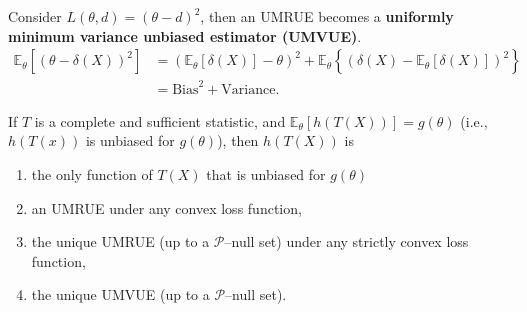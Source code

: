 Consider $L(\theta, d) = (\theta-d)^2$, then an UMRUE becomes a \textbf{uniformly minimum variance unbiased estimator (UMVUE)}.
\begin{align*}
\mathbb{E}_\theta\left[(\theta - \delta(X))^2\right] &= \left(\mathbb{E}_\theta[\delta(X)] - \theta\right)^2 + \mathbb{E}_\theta\left\{\left(\delta(X) - \mathbb{E}_\theta[\delta(X)]\right)^2\right\} \\
&= \text{Bias}^2 + \text{Variance}.
\end{align*}
\begin{thm}
If $T$ is a complete and sufficient statistic, and $\mathbb{E}_\theta[h(T(X))] = g(\theta)$ (i.e., $h(T(x))$ is unbiased for $g(\theta)$), then $h(T(X))$ is
\begin{enumerate}
    \item the only function of $T(X)$ that is unbiased for $g(\theta)$
    \item an UMRUE under any convex loss function,
    \item the unique UMRUE (up to a $\mathcal{P}$--null set) under any strictly convex loss function,
    \item the unique UMVUE (up to a $\mathcal{P}$--null set).
\end{enumerate}
\end{thm}
